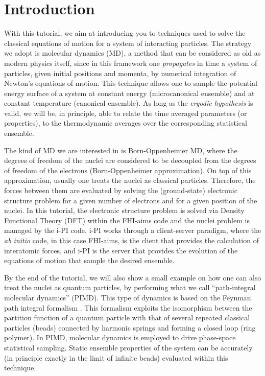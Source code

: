 \documentclass[a4paper,11pt]{scrartcl}
\begin{document}
\section{Introduction}
\par
	With this tutorial, we aim at introducing you to techniques used to solve the classical equations of motion for a system of interacting particles. 
The strategy we adopt is molecular dynamics (MD), a method that can be considered as old as modern physics itself, since in this framework one {\em propagates}  in time a system of particles, given initial positions and momenta, by numerical integration of Newton's equations of motion. 
This technique allows one to sample the potential energy surface of a system at constant energy (microcanonical ensemble) and at constant temperature (canonical ensemble). As long as the {\em ergodic hypothesis} is valid, we will be, in principle, able to relate the time averaged parameters (or properties), to the thermodynamic averages over the corresponding statistical ensemble. 

The kind of MD we are interested in is Born-Oppenheimer MD, where the degrees of freedom of the nuclei are considered to be decoupled from the degrees of freedom of the electrons (Born-Oppenheimer approximation). On top of this approximation, usually one treats the nuclei as classical particles. Therefore, the forces between them are evaluated by solving the (ground-state) electronic structure problem for a given number of electrons and for a given position of the nuclei. 
In this tutorial, the electronic structure problem is solved via Density Functional Theory (DFT) within the FHI-aims code and the nuclei problem is managed by  the i-PI \cite{ipi} code. i-PI works through a client-server paradigm, where the \textit{ab initio} code, in this case FHI-aims, is the client that provides the calculation of interatomic forces, and i-PI is the server that provides the evolution of the equations of motion that sample the desired ensemble. 

By the end of the tutorial, we will also show a small example on how one can also treat the nuclei as quantum particles, by performing what we call ``path-integral molecular dynamics'' (PIMD). This type of dynamics is
based on the Feynman path integral formalism \cite{Feynman}. This 
formalism exploits the isomorphism between the partition function of a quantum particle with that of 
several repeated classical particles (beads) connected by harmonic springs and forming a closed 
loop (ring polymer). In PIMD, molecular dynamics is employed to drive phase-space statistical sampling. Static 
ensemble properties of the system can be accurately (in principle exactly in the limit of infinite beads) evaluated within this technique. 
\end{document}
